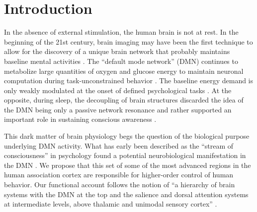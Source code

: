 \documentclass[10pt,letterpaper]{article}
\begin{document}

\section{Introduction}
%
In the absence of external stimulation, the human brain is not at rest.
In the beginning of the 21st century,
brain imaging may have been the first technique
to allow for the discovery of a unique brain network that probably maintains
baseline mental activities
\citep{raichle2001pnas, randy2008, bzdok2015resting}.
The ``default mode network'' (DMN) continues
to metabolize large quantities of
oxygen and glucose energy to maintain
neuronal computation
during task-unconstrained behavior
\citep{kenet2003spontaneously, fiser2004small}.
The baseline energy demand is only weakly modulated
at the onset of defined psychological tasks \citep{raichle_baseline}.
At the opposite, during sleep, the
decoupling of brain structures discarded the idea of the DMN being
only a passive network resonance and rather supported an
important role in sustaining conscious awareness \citep{horovitz2009decoupling}.



This dark matter of brain physiology \citep{raichle2006brain} begs the question
of the biological purpose underlying DMN activity.
What has early been described as the ``stream of consciousness''
in psychology \citep{james1890principles}
found a potential neurobiological manifestation
in the DMN
\citep{shul1997, raichle2001pnas}.
We propose that this set of some of the most advanced regions in
the human association cortex \citep{mesulam1998sensation, margulies2016situating}
are responsible for higher-order control of human behavior.
Our functional account follows the notion of
``a hierarchy of brain systems with
the DMN at the top and the salience and dorsal attention systems
at intermediate levels, above thalamic and unimodal sensory
cortex'' \citep{carhart2010default}.
\end{document}
